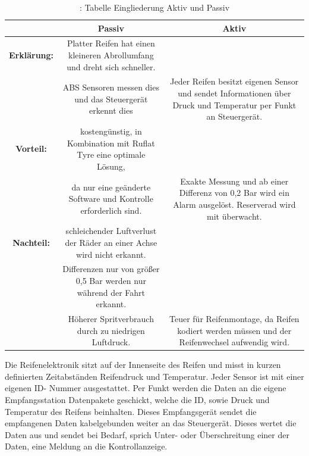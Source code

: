 \documentclass{article}
\begin{document}
				\begin{table}
					
					\begin{tabular}{c|c|c}
						
						\textbf {  } & \textbf{Passiv} & \textbf {Aktiv}\\
						
						
						\hline
						\textbf{Erklärung:} & Platter Reifen hat einen kleineren Abrollumfang und dreht sich schneller.\\&ABS Sensoren messen dies und das Steuergerät erkennt dies & Jeder Reifen besitzt eigenen Sensor und sendet Informationen über Druck und Temperatur per Funkt an Steuergerät.\\
						
						
						\hline
						\textbf{Vorteil:} & kostengünstig, in Kombination mit Ruflat Tyre eine optimale Lösung, \\&da nur eine geänderte Software und Kontrolle erforderlich sind. & Exakte Messung und ab einer Differenz von 0,2 Bar wird ein Alarm ausgelöst. Reserverad wird mit überwacht.\\
						
						
						\hline
						\textbf{Nachteil:} & schleichender Luftverlust der Räder an einer Achse wird nicht erkannt.\\&Differenzen nur von größer 0,5 Bar werden nur während der Fahrt erkannt.\\&  Höherer Spritverbrauch durch zu niedrigen Luftdruck. & Teuer für Reifenmontage, da Reifen kodiert werden müssen und der Reifenwechsel aufwendig wird.\\
						
						
					\end{tabular}
					\caption{ \cite{TS22}: Tabelle Eingliederung Aktiv und Passiv}	
				\end{table}
			
			
				\begin{flushleft}
						
					Die Reifenelektronik sitzt auf der Innenseite des Reifen und misst in kurzen definierten Zeitabständen Reifendruck und Temperatur. Jeder Sensor ist mit einer eigenen ID- Nummer ausgestattet. Per Funkt werden die Daten an die eigene Empfangsstation Datenpakete geschickt, welche die ID, sowie Druck und Temperatur des Reifens beinhalten. Dieses Empfangsgerät sendet die empfangenen Daten kabelgebunden weiter an das Steuergerät. Dieses wertet die Daten aus und sendet bei Bedarf, sprich Unter- oder Überschreitung einer der Daten, eine Meldung an die Kontrollanzeige.
					
				\end{flushleft}	
				
\end{document}
